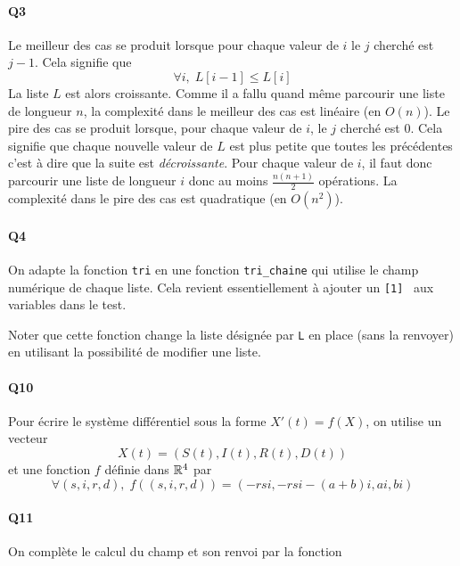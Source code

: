 \paragraph{Q3} Le meilleur des cas se produit lorsque pour chaque valeur de $i$ le $j$ cherché est $j-1$. Cela signifie que 
\begin{displaymath}
  \forall i, \; L[i-1] \leq L[i]
\end{displaymath}
La liste $L$ est alors croissante. Comme il a fallu quand même parcourir une liste de longueur $n$, la complexité dans le meilleur des cas est linéaire (en  $O(n)$).\newline
Le pire des cas se produit lorsque, pour chaque valeur de $i$, le $j$ cherché est $0$. Cela signifie que chaque nouvelle valeur de $L$ est plus petite que toutes les précédentes c'est à dire que la suite est \emph{décroissante}. Pour chaque valeur de $i$, il faut donc parcourir une liste de longueur $i$ donc au moins $\frac{n(n+1)}{2}$ opérations. La complexité dans le pire des cas est quadratique (en $O(n^2)$).

\paragraph{Q4} On adapte la fonction \texttt{tri} en une fonction \texttt{tri\_chaine} qui utilise le champ numérique de chaque liste. Cela revient essentiellement à ajouter un \og\texttt{[1]}\fg~ aux variables dans le test.

Noter que cette fonction change la liste désignée par \texttt{L} en place (sans la renvoyer) en utilisant la possibilité de modifier une liste.

\paragraph{Q10} Pour écrire le système différentiel sous la forme $X'(t) = f(X)$, on utilise un vecteur 
\begin{displaymath}
  X(t) = (S(t), I(t), R(t), D(t))
\end{displaymath}
et une fonction $f$ définie dans $\mathbb{R}^4$ par 
\begin{displaymath}
  \forall (s,i,r,d),\; f((s,i,r,d)) = \left( -r s i, -rsi -(a+b)i, ai,bi \right) 
\end{displaymath}

\paragraph{Q11} On complète le calcul du champ et son renvoi par la fonction


